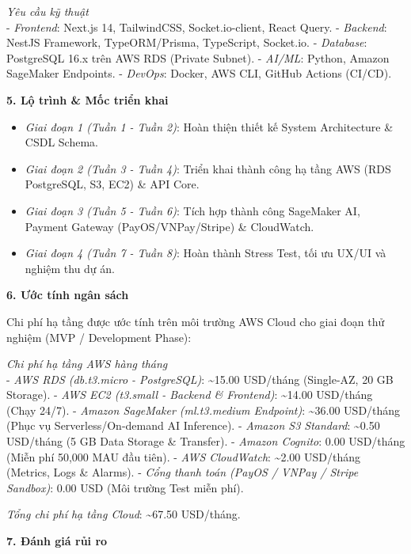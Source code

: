 \emph{Yêu cầu kỹ thuật}\\
- \emph{Frontend}: Next.js 14, TailwindCSS, Socket.io-client, React
Query. - \emph{Backend}: NestJS Framework, TypeORM/Prisma, TypeScript,
Socket.io. - \emph{Database}: PostgreSQL 16.x trên AWS RDS (Private
Subnet). - \emph{AI/ML}: Python, Amazon SageMaker Endpoints. -
\emph{DevOps}: Docker, AWS CLI, GitHub Actions (CI/CD).

\vspace{0.5em}\noindent\textbf{5. Lộ trình \& Mốc triển khai}

\begin{itemize}
\tightlist
\item
  \emph{Giai đoạn 1 (Tuần 1 - Tuần 2)}: Hoàn thiện thiết kế System
  Architecture \& CSDL Schema.
\item
  \emph{Giai đoạn 2 (Tuần 3 - Tuần 4)}: Triển khai thành công hạ tầng
  AWS (RDS PostgreSQL, S3, EC2) \& API Core.
\item
  \emph{Giai đoạn 3 (Tuần 5 - Tuần 6)}: Tích hợp thành công SageMaker
  AI, Payment Gateway (PayOS/VNPay/Stripe) \& CloudWatch.
\item
  \emph{Giai đoạn 4 (Tuần 7 - Tuần 8)}: Hoàn thành Stress Test, tối ưu
  UX/UI và nghiệm thu dự án.
\end{itemize}

\vspace{0.5em}\noindent\textbf{6. Ước tính ngân sách}

Chi phí hạ tầng được ước tính trên môi trường AWS Cloud cho giai đoạn
thử nghiệm (MVP / Development Phase):

\emph{Chi phí hạ tầng AWS hàng tháng}\\
- \emph{AWS RDS (db.t3.micro - PostgreSQL)}: \textasciitilde15.00
USD/tháng (Single-AZ, 20 GB Storage). - \emph{AWS EC2 (t3.small -
Backend \& Frontend)}: \textasciitilde14.00 USD/tháng (Chạy 24/7). -
\emph{Amazon SageMaker (ml.t3.medium Endpoint)}: \textasciitilde36.00
USD/tháng (Phục vụ Serverless/On-demand AI Inference). - \emph{Amazon S3
Standard}: \textasciitilde0.50 USD/tháng (5 GB Data Storage \&
Transfer). - \emph{Amazon Cognito}: 0.00 USD/tháng (Miễn phí 50,000 MAU
đầu tiên). - \emph{AWS CloudWatch}: \textasciitilde2.00 USD/tháng
(Metrics, Logs \& Alarms). - \emph{Cổng thanh toán (PayOS / VNPay /
Stripe Sandbox)}: 0.00 USD (Môi trường Test miễn phí).

\emph{Tổng chi phí hạ tầng Cloud}: \textasciitilde67.50 USD/tháng.

\vspace{0.5em}\noindent\textbf{7. Đánh giá rủi ro}

